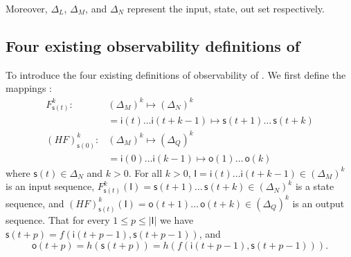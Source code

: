 %  
Moreover, $\Delta_L $, $\Delta_M$, and $\Delta_N$ represent the input, state, out set respectively. 

\subsection{Four existing observability definitions of \BCNs}
To introduce the four existing definitions of observability of \BCNs. 
We first define the mappings \cite{Zhang2016Observability}:
\begin{equation}
\begin{split}
F^k_{\mathsf{s}(t)}:& (\Delta_M)^k\mapsto(\Delta_N)^k\\
&=\mathsf{i}(t)\ldots \mathsf{i}({t+k-1}) \mapsto \mathsf{s}(t+1) \ldots\, \mathsf{s}(t+k)\\
(HF)^k_{\mathsf{s}(0)} :& (\Delta_M)^k\mapsto(\Delta_Q)^k\\
 &=\mathsf{i}(0)\ldots \mathsf{i}(k-1) \mapsto \mathsf{o}(1)\ldots\, \mathsf{o}(k)
\end{split}
\label{equ:6}
\end{equation}
where $\mathsf{s}(t)\in \Delta_N$ and $k>0$. For all  $k>0$,
$\mathsf{I}=\mathsf{i}(t)\ldots \mathsf{i}({t+k-1}) \in(\Delta_M)^k$
is an input sequence, 
$F^k_{\mathsf{s}(t)}(\mathsf{I})=\mathsf{s}(t+1) \ldots\, \mathsf{s}(t+k) \in(\Delta_N)^k$
 is a state sequence, and 
 $(HF)^k_{\mathsf{s}(t)}(\mathsf{I})=\mathsf{o}(t+1)\ldots\, \mathsf{o}(t+k) \in(\Delta_Q)^k$
 is an output sequence. That for every $1\le p \le |\mathsf{I}|$ we have 
 $\mathsf{s}(t+p)=f(\mathsf{i}(t+p-1),\mathsf{s}(t+p-1))$,
and 
 \[\mathsf{o}(t+p)=h(\mathsf{s}(t+p))=h(f(\mathsf{i}(t+p-1),\mathsf{s}(t+p-1))).\] 

